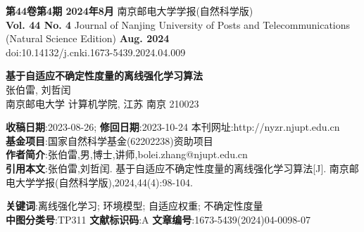 \documentclass{article}
\begin{document}
\noindent \textbf{第44卷第4期 2024年8月} \quad 南京邮电大学学报(自然科学版) \\
\noindent \textbf{Vol. 44 No. 4} \quad Journal of Nanjing University of Posts and Telecommunications (Natural Science Edition) \quad \textbf{Aug. 2024} \\
\noindent doi:10.14132/j.cnki.1673-5439.2024.04.009

\begin{center}
  \Large \textbf{基于自适应不确定性度量的离线强化学习算法} \\
  \vspace{0.5em}
  \small 张伯雷, 刘哲闰 \\
  \vspace{0.3em}
  \small 南京邮电大学 计算机学院, 江苏 南京 210023 \\
\end{center}

\noindent \textbf{收稿日期}:2023-08-26; \textbf{修回日期}:2023-10-24 \quad 本刊网址:http://nyzr.njupt.edu.cn \\
\noindent \textbf{基金项目}:国家自然科学基金(62202238)资助项目 \\
\noindent \textbf{作者简介}:张伯雷,男,博士,讲师,bolei.zhang@njupt.edu.cn \\
\noindent \textbf{引用本文}:张伯雷,刘哲闰. 基于自适应不确定性度量的离线强化学习算法[J]. 南京邮电大学学报(自然科学版),2024,44(4):98-104.

\begin{abstract}
  离线强化学习可以从历史经验数据中直接学习出可执行的策略，由此来避免与在线环境的高代价交互，可应用于机器人控制、无人驾驶、智能营销等多种真实场景。有模型的离线强化学习首先通过监督学习构造环境模型，并通过与该环境模型交互来优化学习策略，具有样本效率高的特点，是最常用的离线强化学习算法。然而，由于离线数据集存在分布偏移问题，现有的方法往往通过静态的方法来评估此种不确定性，无法动态自适应于智能体策略的优化过程。针对以上问题，提出一种自适应的不确定性度量方法，首先对状态的不确定性进行估计，然后通过动态自适应的方法来衡量环境模型的不确定性，从而使得智能体可以在探索-保守中取得更好的平衡。在多个基准的离线数据集对算法进行了验证，实验结果表明，该算法在多个数据集中都取得最好的效果，消融实验等也验证了所提方法的有效性。
\end{abstract}
\noindent \textbf{关键词}:离线强化学习; 环境模型; 自适应权重; 不确定性度量 \\
\noindent \textbf{中图分类号}:TP311 \quad \textbf{文献标识码}:A \quad \textbf{文章编号}:1673-5439(2024)04-0098-07
\end{document}
